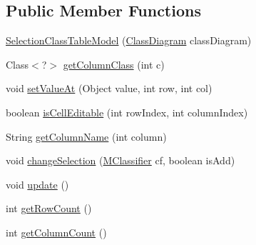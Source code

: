 \subsection*{Public Member Functions}
\begin{DoxyCompactItemize}
\item 
\hyperlink{classorg_1_1tzi_1_1use_1_1gui_1_1views_1_1selection_1_1classselection_1_1_selection_class_table_model_ab5b0c772cacc74bb700f8be5131ba7d5}{Selection\-Class\-Table\-Model} (\hyperlink{classorg_1_1tzi_1_1use_1_1gui_1_1views_1_1diagrams_1_1classdiagram_1_1_class_diagram}{Class\-Diagram} class\-Diagram)
\item 
Class$<$?$>$ \hyperlink{classorg_1_1tzi_1_1use_1_1gui_1_1views_1_1selection_1_1classselection_1_1_selection_class_table_model_aafc55ed3408fd43fa4398ff3f217d883}{get\-Column\-Class} (int c)
\item 
void \hyperlink{classorg_1_1tzi_1_1use_1_1gui_1_1views_1_1selection_1_1classselection_1_1_selection_class_table_model_a1f0af4fa724f3cd64ab142c23900f335}{set\-Value\-At} (Object value, int row, int col)
\item 
boolean \hyperlink{classorg_1_1tzi_1_1use_1_1gui_1_1views_1_1selection_1_1classselection_1_1_selection_class_table_model_aece46816cef02097bfb6673c64619e99}{is\-Cell\-Editable} (int row\-Index, int column\-Index)
\item 
String \hyperlink{classorg_1_1tzi_1_1use_1_1gui_1_1views_1_1selection_1_1classselection_1_1_selection_class_table_model_a5fc35b013702cd14ffdfcf9a063e130b}{get\-Column\-Name} (int column)
\item 
void \hyperlink{classorg_1_1tzi_1_1use_1_1gui_1_1views_1_1selection_1_1classselection_1_1_selection_class_table_model_a60b5f6b1834a84b12a8e0f7e38c081f9}{change\-Selection} (\hyperlink{interfaceorg_1_1tzi_1_1use_1_1uml_1_1mm_1_1_m_classifier}{M\-Classifier} cf, boolean is\-Add)
\item 
void \hyperlink{classorg_1_1tzi_1_1use_1_1gui_1_1views_1_1selection_1_1classselection_1_1_selection_class_table_model_ab5b4a971062eef3b14951983db625602}{update} ()
\item 
int \hyperlink{classorg_1_1tzi_1_1use_1_1gui_1_1views_1_1selection_1_1classselection_1_1_selection_class_table_model_a103360e43556062d2063046bf360f530}{get\-Row\-Count} ()
\item 
int \hyperlink{classorg_1_1tzi_1_1use_1_1gui_1_1views_1_1selection_1_1classselection_1_1_selection_class_table_model_a826e6ae3b00f5a0b1c9a3b2e5ca90dcc}{get\-Column\-Count} ()
\item 

\end{DoxyCompactItemize}
